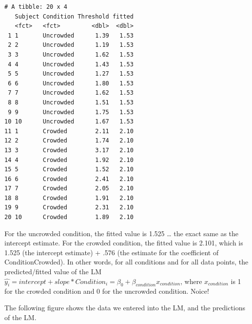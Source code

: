 \documentclass[
]{article}
\begin{document}
\footnotesize

\begin{verbatim}
# A tibble: 20 x 4
   Subject Condition Threshold fitted
   <fct>   <fct>         <dbl>  <dbl>
 1 1       Uncrowded      1.39   1.53
 2 2       Uncrowded      1.19   1.53
 3 3       Uncrowded      1.62   1.53
 4 4       Uncrowded      1.43   1.53
 5 5       Uncrowded      1.27   1.53
 6 6       Uncrowded      1.80   1.53
 7 7       Uncrowded      1.62   1.53
 8 8       Uncrowded      1.51   1.53
 9 9       Uncrowded      1.75   1.53
10 10      Uncrowded      1.67   1.53
11 1       Crowded        2.11   2.10
12 2       Crowded        1.74   2.10
13 3       Crowded        3.17   2.10
14 4       Crowded        1.92   2.10
15 5       Crowded        1.52   2.10
16 6       Crowded        2.41   2.10
17 7       Crowded        2.05   2.10
18 8       Crowded        1.91   2.10
19 9       Crowded        2.31   2.10
20 10      Crowded        1.89   2.10
\end{verbatim}

\normalsize

For the uncrowded condition, the fitted value is 1.525 \ldots{} the
exact same as the intercept estimate. For the crowded condition, the
fitted value is 2.101, which is 1.525 (the intercept estimate) + .576
(the estimate for the coefficient of ConditionCrowded). In other words,
for all conditions and for all data points, the predicted/fitted value
of the LM
\(\widehat{y_i} = intercept + slope * Condition_i = \beta_0 + \beta_{condition} x_{condition}\),
where \(x_{condition}\) is 1 for the crowded condition and 0 for the
uncrowded condition. Noice!

The following figure shows the data we entered into the LM, and the
predictions of the LM.

\footnotesize
\end{document}

